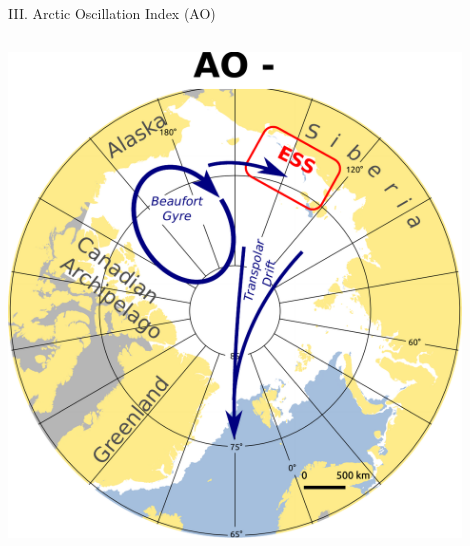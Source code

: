 \documentclass[8pt]{beamer}
\begin{document}
\setwatermark{\fontsize{125pt}{125pt}\selectfont{}}
\begin{frame}[fragile]{III. Arctic Oscillation Index (AO)}
	\begin{columns}
		\includegraphics[width=0.9\textwidth]{./img/AO-.pdf}


\end{columns}
\end{frame}
\end{document}
